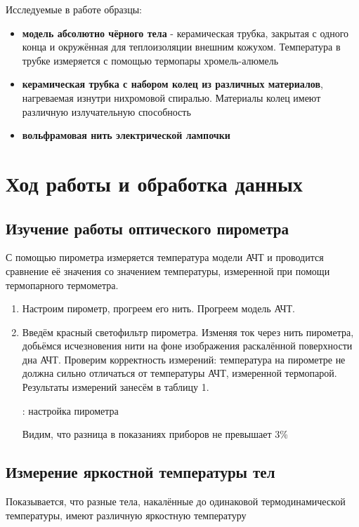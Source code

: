 \documentclass[15pt,a5paper,reqno]{article}
\begin{document}
Исследуемые в работе образцы:
\begin{itemize}
    \item \textbf{модель абсолютно чёрного тела} - керамическая трубка, закрытая с одного конца и окружённая для теплоизоляции внешним кожухом. Температура в трубке измеряется с помощью термопары хромель-алюмель
    \item \textbf{керамическая трубка с набором колец из различных материалов}, нагреваемая изнутри нихромовой спиралью. Материалы колец имеют различную излучательную способность
    \item \textbf{вольфрамовая нить электрической лампочки}
\end{itemize}


\section{Ход работы и обработка данных}

\subsection{Изучение работы оптического пирометра}

С помощью пирометра измеряется температура модели АЧТ и проводится сравнение её значения  со значением температуры, измеренной при помощи термопарного термометра.
\begin{enumerate}
    \item Настроим пирометр, прогреем его нить. Прогреем модель АЧТ.
    \item Введём красный светофильтр пирометра. Изменяя ток через нить пирометра, добьёмся исчезновения нити на фоне изображения раскалённой поверхности дна АЧТ. Проверим корректность измерений: температура на пирометре не должна сильно отличаться от температуры АЧТ, измеренной термопарой. Результаты измерений занесём в таблицу 1.

    \begin{table}[h!]
        \centering
        
        \caption{: настройка пирометра}
    \label{tb_1}
    \end{table}

Видим, что разница в показаниях приборов не превышает 3\%
\end{enumerate}

\subsection{Измерение яркостной температуры тел}
Показывается, что разные тела, накалённые до одинаковой термодинамической температуры, имеют различную яркостную температуру
\end{document}
